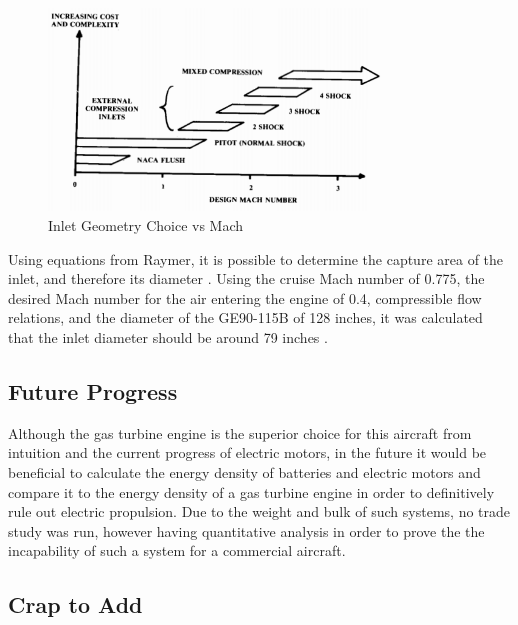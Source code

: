 \begin{figure} [h!]
    \centering
    \includegraphics[width=0.8\textwidth]{Photos/inletapplicability.PNG}
    \caption{Inlet Geometry Choice vs Mach}
    \label{fig:inlet}
\end{figure}

Using equations from Raymer, it is possible to determine the capture area of the inlet, and therefore its diameter \cite{raymer}. Using the cruise Mach number of 0.775, the desired Mach number for the air entering the engine of 0.4, compressible flow relations, and the diameter of the GE90-115B of 128 inches, it was calculated that the inlet diameter should be around 79 inches \cite{ge}.


\subsection{Future Progress}

Although the gas turbine engine is the superior choice for this aircraft from intuition and the current progress of electric motors, in the future it would be beneficial to calculate the energy density of batteries and electric motors and compare it to the energy density of a gas turbine engine in order to definitively rule out electric propulsion. Due to the weight and bulk of such systems, no trade study was run, however having quantitative analysis in order to prove the the incapability of such a system for a commercial aircraft.


\subsection{Crap to Add}

